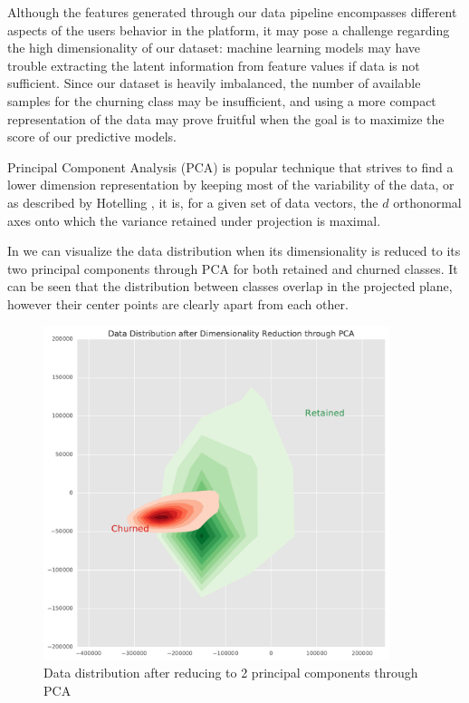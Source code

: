 \documentclass{kththesis}
\begin{document}
Although the features generated through our data pipeline encompasses different aspects of the users behavior in the platform, it may pose a challenge regarding the high dimensionality of our dataset: machine learning models may have trouble extracting the latent information from feature values if data is not sufficient. Since our dataset is heavily imbalanced, the number of available samples for the churning class may be insufficient, and using a more compact representation of the data may prove fruitful when the goal is to maximize the score of our predictive models.

Principal Component Analysis (PCA) is popular technique that strives to find a lower dimension representation by keeping most of the variability of the data, or as described by Hotelling \citep{hotelling1933analysis}, it is, for a given set of data vectors, the $d$ orthonormal axes onto which the variance retained under projection is maximal.

In  we can visualize the data distribution when its dimensionality is reduced to its two principal components through PCA for both retained and churned classes. It can be seen that the distribution between classes overlap in the projected plane, however their center points are clearly apart from each other.

	\begin{figure}[h]
    \centering
    \includegraphics[width=0.9\textwidth,keepaspectratio]{figures/pca_data.pdf}
    \caption{Data distribution after reducing to 2 principal components through PCA}
    \label{fig:pca_data}
	\end{figure}
\end{document}
